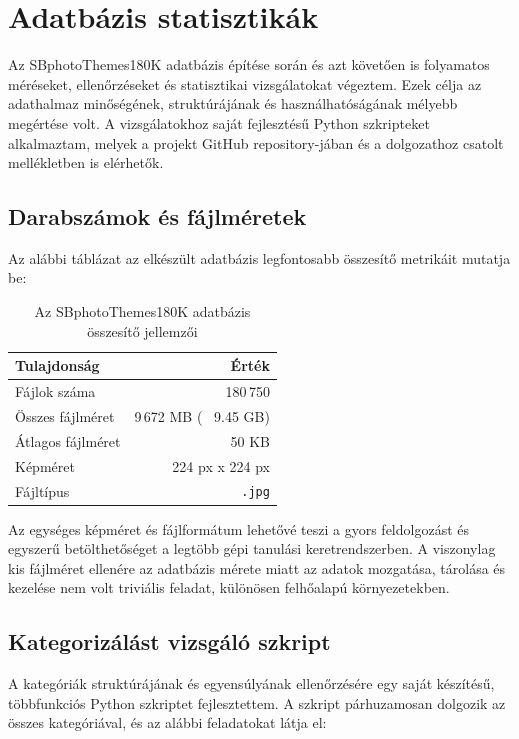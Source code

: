     \section{Adatbázis statisztikák}
        Az SBphotoThemes180K adatbázis építése során és azt követően is folyamatos méréseket, ellenőrzéseket és statisztikai vizsgálatokat végeztem. Ezek célja az adathalmaz minőségének, struktúrájának és használhatóságának mélyebb megértése volt. A vizsgálatokhoz saját fejlesztésű Python szkripteket alkalmaztam, melyek a projekt GitHub repository-jában és a dolgozathoz csatolt mellékletben is elérhetők.
        
        \subsection{Darabszámok és fájlméretek}
            Az alábbi táblázat az elkészült adatbázis legfontosabb összesítő metrikáit mutatja be:
            
            \begin{table}[H]
            \centering
            \caption{Az SBphotoThemes180K adatbázis összesítő jellemzői}
            \begin{tabular}{|l|r|}
            \hline
            \textbf{Tulajdonság} & \textbf{Érték} \\
            \hline
            Fájlok száma         & 180\,750 \\
            Összes fájlméret     & 9\,672 MB (~ 9.45 GB) \\
            Átlagos fájlméret    & 50 KB \\
            Képméret             & 224 px x 224 px \\
            Fájltípus            & \texttt{.jpg} \\
            \hline
            \end{tabular}
            \label{tab:db-summary}
            \end{table}
            
            Az egységes képméret és fájlformátum lehetővé teszi a gyors feldolgozást és egyszerű betölthetőséget a legtöbb gépi tanulási keretrendszerben. A viszonylag kis fájlméret ellenére az adatbázis mérete miatt az adatok mozgatása, tárolása és kezelése nem volt triviális feladat, különösen felhőalapú környezetekben.
        
        \subsection{Kategorizálást vizsgáló szkript}
            A kategóriák struktúrájának és egyensúlyának ellenőrzésére egy saját készítésű, többfunkciós Python szkriptet fejlesztettem. A szkript párhuzamosan dolgozik az összes kategóriával, és az alábbi feladatokat látja el:
            

